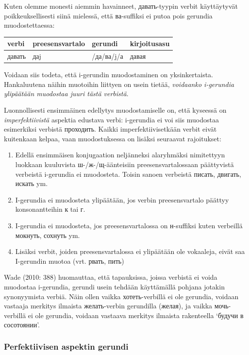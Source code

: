 \documentclass[]{scrartcl}
\providecommand{\tightlist}{%
  \setlength{\itemsep}{0pt}\setlength{\parskip}{0pt}}
\begin{document}
Kuten olemme monesti aiemmin havainneet, давать-tyypin verbit
käyttäytyvät poikkeuksellisesti siinä mielessä, että ва-suffiksi ei
putoa pois gerundia muodostettaessa:

\begin{longtable}[c]{@{}llll@{}}
\toprule
verbi & preesensvartalo & gerundi & kirjoitusasu\tabularnewline
\midrule
\endhead
давать & даj & /да/ва/j/а & давая\tabularnewline
\bottomrule
\end{longtable}

Voidaan siis todeta, että i-gerundin muodostaminen on yksinkertaista.
Hankaluutena näihin muotoihin liittyen on usein tietää, \emph{voidaanko
i-gerundia ylipäätään muodostaa juuri tästä verbistä}.

Luonnollisesti ensimmäinen edellytys muodostamiselle on, että kyseessä
on \emph{imperfektiivistä} aspektia edustava verbi: i-gerundia ei voi
siis muodostaa esimerkiksi verbistä проходить. Kaikki
imperfektiivisetkään verbit eivät kuitenkaan kelpaa, vaan muodostuksessa
on lisäksi seuraavat rajoitukset:

\begin{enumerate}
\def\labelenumi{\arabic{enumi}.}
\tightlist
\item
  Edellä ensimmäisen konjugaation neljänneksi alaryhmäksi nimitettyyn
  luokkaan kuuluvista ш-/ж-/щ-äänteisiin preesensvartalossaan
  päättyvistä verbeistä i-gerundia ei muodosteta. Toisin sanoen
  verbeistä писать, двигать, искать ym.
\item
  I-gerundia ei muodosteta ylipäätään, jos verbin preesensvartalo
  päättyy konsonantteihin к tai г.
\item
  I-gerundia ei muodosteta, jos preesensvartalossa on н-suffiksi kuten
  verbeillä мокнуть, сохнуть ym.
\item
  Lisäksi verbit, joiden preesensvartalossa ei ylipäätään ole vokaaleja,
  eivät saa I-gerundin muotoa (vrt. рвать, пить)
\end{enumerate}

Wade (2010: 388) huomauttaa, että tapauksissa, joissa verbistä ei voida
muodostaa i-gerundia, gerundi usein tehdään käyttämällä pohjana jotakin
synonyymista verbiä. Näin ollen vaikka хотеть-verbillä ei ole gerundia,
voidaan vastaaja merkitys ilmaista желать-verbin gerundilla (желая), ja
vaikka мочь-verbillä ei ole gerundia, voidaan vastaava merkitys ilmaista
rakenteella `будучи в сосотоянии'.

\subsubsection{Perfektiivisen aspektin
gerundi}\label{perfektiivisen-aspektin-gerundi}
\end{document}
